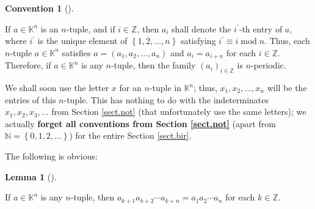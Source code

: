 \documentclass[numbers=enddot,12pt,final,onecolumn,notitlepage]{scrartcl}%
\theoremstyle{definition}
\newtheorem{lem}[theo]{Lemma}
\newenvironment{lemma}[1][]
{\begin{lem}[#1]\begin{leftbar}}
{\end{leftbar}\end{lem}}
\newtheorem{conv}[theo]{Convention}
\newenvironment{convention}[1][]
{\begin{conv}[#1]\begin{leftbar}}
{\end{leftbar}\end{conv}}
\begin{document}
\begin{convention}
\label{conv.bir.peri}If $a\in\mathbb{K}^{n}$ is an $n$-tuple, and if
$i\in\mathbb{Z}$, then $a_{i}$ shall denote the $i^{\prime}$-th entry of $a$,
where $i^{\prime}$ is the unique element of $\left\{  1,2,\ldots,n\right\}  $
satisfying $i^{\prime}\equiv i\operatorname{mod}n$. Thus, each $n$-tuple
$a\in\mathbb{K}^{n}$ satisfies $a=\left(  a_{1},a_{2},\ldots,a_{n}\right)  $
and $a_{i}=a_{i+n}$ for each $i\in\mathbb{Z}$. Therefore, if $a\in
\mathbb{K}^{n}$ is any $n$-tuple, then the family $\left(  a_{i}\right)
_{i\in\mathbb{Z}}$ is $n$-periodic.
\end{convention}

We shall soon use the letter $x$ for an $n$-tuple in $\mathbb{K}^{n}$; thus,
$x_{1},x_{2},\ldots,x_{n}$ will be the entries of this $n$-tuple. This has
nothing to do with the indeterminates $x_{1},x_{2},x_{3},\ldots$ from Section
\ref{sect.not} (that unfortunately use the same letters); we actually
\textbf{forget all conventions from Section \ref{sect.not}} (apart from
$\mathbb{N}=\left\{  0,1,2,\ldots\right\}  $) for the entire Section
\ref{sect.bir}.

The following is obvious:

\begin{lemma}
\label{lem.aprod}If $a\in\mathbb{K}^{n}$ is any $n$-tuple, then $a_{k+1}%
a_{k+2}\cdots a_{k+n}=a_{1}a_{2}\cdots a_{n}$ for each $k\in\mathbb{Z}$.
\end{lemma}
\end{document}
